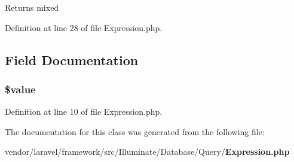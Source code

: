 \begin{DoxyReturn}{Returns}
mixed 
\end{DoxyReturn}


Definition at line 28 of file Expression.\+php.



\subsection{Field Documentation}
\subsubsection[{\$value}]{\setlength{\rightskip}{0pt plus 5cm}\$value\hspace{0.3cm}{\ttfamily [protected]}}\label{class_illuminate_1_1_database_1_1_query_1_1_expression_a0f298096f322952a72a50f98a74c7b60}


Definition at line 10 of file Expression.\+php.



The documentation for this class was generated from the following file\+:\begin{DoxyCompactItemize}
\item 
vendor/laravel/framework/src/\+Illuminate/\+Database/\+Query/{\bf Expression.\+php}\end{DoxyCompactItemize}
